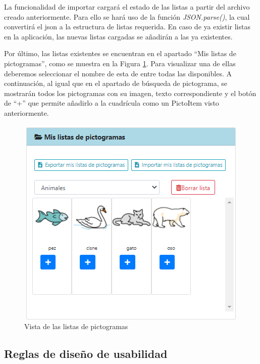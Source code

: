 La funcionalidad de importar cargará el estado de las listas a partir del archivo creado anteriormente. Para ello se hará uso de la función \textit{JSON.parse()}, la cual convertirá el json a la estructura de listas requerida. En caso de ya existir listas en la aplicación, las nuevas listas cargadas se añadirán a las ya existentes. 

Por último, las listas existentes se encuentran en el apartado “Mis listas de pictogramas”, como se muestra en la Figura \ref{fig:lisapictosel}. Para visualizar una de ellas deberemos seleccionar el nombre de esta de entre todas las disponibles. A continuación, al igual que en el apartado de búsqueda de pictograma, se mostrarán todos los pictogramas con su imagen, texto correspondiente y el botón de “+” que permite añadirlo a la cuadrícula como un PictoItem visto anteriormente.

\begin{figure}[h!]
	\centering
	\includegraphics[width=0.7\linewidth]{Imagenes/Bitmap/lisaPictoSel}
	\caption{Vista de las listas de pictogramas}
	\label{fig:lisapictosel}
\end{figure}

\subsection{Reglas de diseño de usabilidad}

